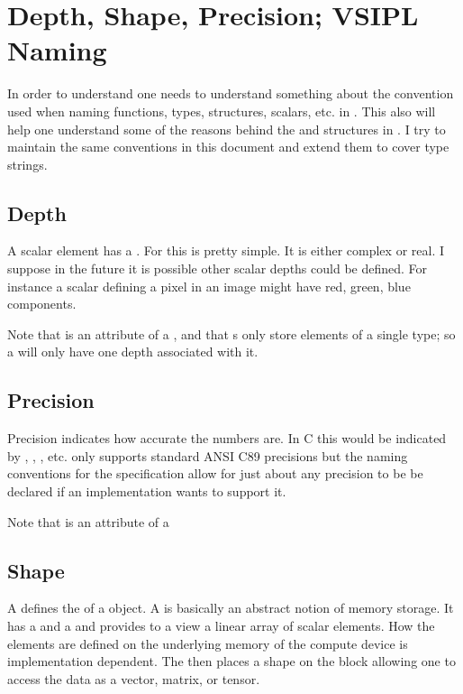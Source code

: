 \clearpage
\section*{Depth, Shape, Precision; VSIPL Naming}
In order to understand \cvl{} one needs to understand something about the convention used when naming functions, types, structures, scalars, etc. in \cvl. This also will help one understand some of the reasons behind the  and  structures in \cvl. I try to maintain the same conventions in this document and extend them to cover \pyjv{} type strings.
%
\subsection*{Depth}
A scalar element has a .  For  this is pretty simple.  It is either complex or real. I suppose in the future it is possible other scalar depths could be defined. For instance a scalar defining a pixel in an image might have red, green, blue components. 

Note that  is an attribute of a , and that s only store elements of a single type; so a  will only have one depth associated with it. 
%
\subsection*{Precision}
Precision indicates how accurate the numbers are. In C this would be indicated by , , , etc. \jv{} only supports standard ANSI C89 precisions but the naming conventions for the  specification allow for just about any precision to be be declared if an implementation wants to support it.

Note that  is an attribute of a 
%
\subsection*{Shape}
A  defines the  of a  object. A  is basically an abstract notion of memory storage. It has a  and a  and provides to a view a linear array of scalar elements.  How the elements are defined on the underlying memory of the compute device is implementation dependent. The  then places a shape on the block allowing one to access the data as a vector, matrix, or tensor. 

